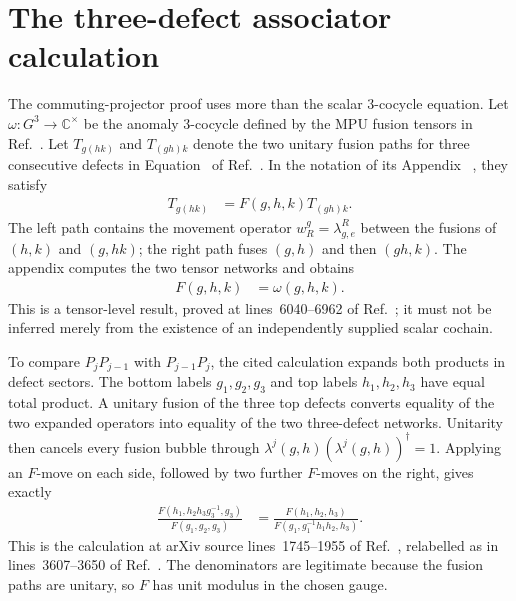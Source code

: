 \documentclass{article}
\begin{document}
\section{The three-defect associator calculation}

The commuting-projector proof uses more than the scalar $3$-cocycle equation.
Let $\omega\colon G^3\to\mathbb C^\times$ be the anomaly $3$-cocycle defined by
the MPU fusion tensors in
Ref.~\cite[lines~1506--1545]{FrancoRubio2025MPUGauging}.
Let $T_{g(hk)}$ and $T_{(gh)k}$ denote the two unitary fusion paths for three
consecutive defects in Equation~ of
Ref.~\cite[lines~3602--3655]{FrancoRubio2025MPUGauging}.  In the notation of
its Appendix~
\cite[lines~6040--6961]{FrancoRubio2025MPUGauging}, they satisfy
\begin{align}
    T_{g(hk)}
        &=F(g,h,k)T_{(gh)k}.
    \label{eq:fbc25_gauss_three_defect_associator}
\end{align}
The left path contains the movement operator
$w_R^g=\lambda^R_{g,e}$ between the fusions of $(h,k)$ and $(g,hk)$; the
right path fuses $(g,h)$ and then $(gh,k)$.  The appendix computes the two
tensor networks and obtains
\begin{align}
    F(g,h,k)&=\omega(g,h,k).
    \label{eq:fbc25_gauss_associator_is_omega}
\end{align}
This is a tensor-level result, proved at lines~6040--6962 of
Ref.~\cite{FrancoRubio2025MPUGauging}; it must not be inferred merely from
the existence of an independently supplied scalar cochain.

To compare $P_jP_{j-1}$ with $P_{j-1}P_j$, the cited calculation expands both
products in defect sectors.  The bottom labels
$g_1,g_2,g_3$ and top labels $h_1,h_2,h_3$ have equal total product.  A
unitary fusion of the three top defects converts equality of the two expanded
operators into equality of the two three-defect networks.  Unitarity then
cancels every fusion bubble through
$\lambda^j(g,h)(\lambda^j(g,h))^\dagger=1$.  Applying an $F$-move on each
side, followed by two further $F$-moves on the right, gives exactly
\begin{align}
    \frac{F(h_1,h_2h_3g_3^{-1},g_3)}
         {F(g_1,g_2,g_3)}
        &=
      \frac{F(h_1,h_2,h_3)}
           {F(g_1,g_1^{-1}h_1h_2,h_3)}.
    \label{eq:fbc25_gauss_adjacent_commutation_condition}
\end{align}
This is the calculation at arXiv source lines~1745--1955 of
Ref.~\cite{Seifnashri2024LSM}, relabelled as in lines~3607--3650 of
Ref.~\cite{FrancoRubio2025MPUGauging}.  The denominators are legitimate
because the fusion paths are unitary, so $F$ has unit modulus in the chosen
gauge.
\end{document}
